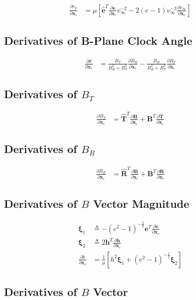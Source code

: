 \documentclass[]{article}
\newcommand{\vb}[1]{\bm{#1}} %
\newcommand{\vbh}[1]{\hat{\bm{#1}}} %
\newcommand{\pd}[2]{\frac{\partial #1}{\partial #2}} %
\newcommand{\xc}[0]{\vb{x}_c}
\begin{document}
\begin{align}
	\pd{r_p}{\xc} &= \mu \left[ \vbh{e}^T \pd{\vb{e}}{\xc} v_{\infty}^{-2} - 2 \left( e - 1 \right) v_{\infty}^{-3} \pd{v_{\infty}}{\xc} \right]
\end{align}

\subsection{Derivatives of B-Plane Clock Angle}

\begin{align}
	\pd{\theta}{\xc} &= \frac{B_T}{B_R^2 + B_T^2} \pd{B_R}{\xc} - \frac{B_R}{B_R^2 + B_T^2} \pd{B_T}{\xc}
\end{align}

\subsection{Derivatives of $B_T$}

\begin{align}
	\pd{B_T}{\xc} &= \vbh{T}^T \pd{\vb{B}}{\xc} + \vb{B}^T \pd{\vbh{T}}{\xc}
\end{align}

\subsection{Derivatives of $B_R$}

\begin{align}
\pd{B_R}{\xc} &= \vbh{R}^T \pd{\vb{B}}{\xc} + \vb{B}^T \pd{\vbh{R}}{\xc}
\end{align}

\subsection{Derivatives of $B$ Vector Magnitude}

\begin{align}
	\vb{\xi}_1 &\triangleq - \left( e^2 - 1 \right)^{-\frac{3}{2}} \vb{e}^T \pd{\vb{e}}{\xc} \\
	\vb{\xi}_2 &\triangleq 2 \vb{h}^T \pd{\vb{h}}{\xc} \\
	\pd{b}{\xc} &= \frac{1}{\mu} \left[ h^2 \vb{\xi}_1 + \left( e^2 - 1 \right)^{-\frac{1}{2}} \vb{\xi}_2 \right]
\end{align}

\subsection{Derivatives of $B$ Vector}
\end{document}
